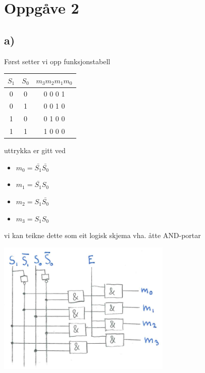 \documentclass[12pt,a4paper]{article}
\begin{document}
    \section{Oppgåve 2}
      \subsection{a)}
        Først setter vi opp funksjonstabell
        \begin{center}
          \begin{tabular}{ |c|c|c| }
            \hline
            $S_1$ & $S_0$ & $m_3m_2m_1m_0$ \\
            \hline
            0 & 0 & 0  0  0  1 \\
            \hline
            0 & 1 & 0  0  1  0 \\
            \hline
            1 & 0 & 0  1  0  0 \\
            \hline
            1 & 1 & 1  0  0  0 \\
            \hline
          \end{tabular}
        \end{center}

        uttrykka er gitt ved
        \begin{itemize}
          \item $m_0 = \bar{S_1}\bar{S_0}$
          \item $m_1 = \bar{S_1}S_0$
          \item $m_2 = S_1\bar{S_0}$
          \item $m_3 = S_1S_0$
        \end{itemize}

        vi kan teikne dette som eit logisk skjema vha. åtte AND-portar
        \begin{center}
          \includegraphics[width=83mm]{03_2a}
        \end{center}
\end{document}

